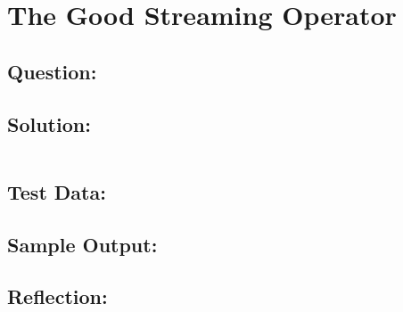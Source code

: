 \documentclass[Lab-B.tex]{subfiles}
\begin{document}
    \section{The Good Streaming Operator}
        \subsection*{Question:}
            
        \subsection*{Solution:}
            \inputminted{cpp}{}%

        \subsection*{Test Data:}
        
        \subsection*{Sample Output:}

        \subsection*{Reflection:}
\end{document}
